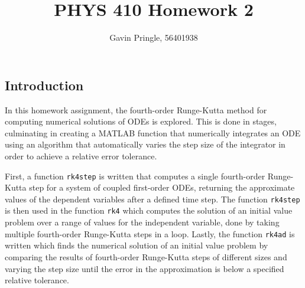 \documentclass[10pt]{article}
\title{PHYS 410 Homework 2}
\author{Gavin Pringle, 56401938}
\def\code#1{\texttt{#1}} %
\begin{document}
\maketitle


\subsection*{Introduction}

In this homework assignment, the fourth-order Runge-Kutta method for computing numerical solutions of 
ODEs is explored. This is done in stages, culminating in creating a MATLAB function that numerically
integrates an ODE using an algorithm that automatically varies the step size of the integrator in order
to achieve a relative error tolerance. 

First, a function \code{rk4step} is written that computes a single fourth-order Runge-Kutta step for a 
system of coupled first-order ODEs, returning the approximate values of the dependent variables after
a defined time step. The function \code{rk4step} is then used in the function \code{rk4} which computes 
the solution of an initial value problem over a range of values for the independent variable, done by 
taking multiple fourth-order Runge-Kutta steps in a loop. Lastly, the function \code{rk4ad} is written 
which finds the numerical solution of an initial value problem by comparing the results of fourth-order 
Runge-Kutta steps of different sizes and varying the step size until the error in the approximation is 
below a specified relative tolerance.

\end{document}

